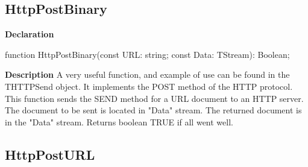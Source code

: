 \documentclass{report}
\newif\ifpdf
\begin{document}
\subsection*{HttpPostBinary}
\fi
\label{httpsend-HttpPostBinary}
\begin{list}{}{
\setlength{\itemindent}{0cm}
\setlength{\listparindent}{0cm}
\setlength{\leftmargin}{\evensidemargin}
\addtolength{\leftmargin}{\tmplength}
\settowidth{\labelsep}{X}
\addtolength{\leftmargin}{\labelsep}
\setlength{\labelwidth}{\tmplength}
}
\item[\textbf{Declaration}\hfill]
\ifpdf
\begin{flushleft}
\fi
\begin{ttfamily}
function HttpPostBinary(const URL: string; const Data: TStream): Boolean;\end{ttfamily}

\ifpdf
\end{flushleft}
\fi

\par
\item[\textbf{Description}]
A very useful function, and example of use can be found in the THTTPSend object. It implements the POST method of the HTTP protocol. This function sends the SEND method for a URL document to an HTTP server. The document to be sent is located in "Data" stream. The returned document is in the "Data" stream. Returns boolean TRUE if all went well.

\end{list}
\ifpdf
\subsection*{\large{\textbf{HttpPostURL}}\normalsize\hspace{1ex}\hrulefill}
\else
\end{document}
